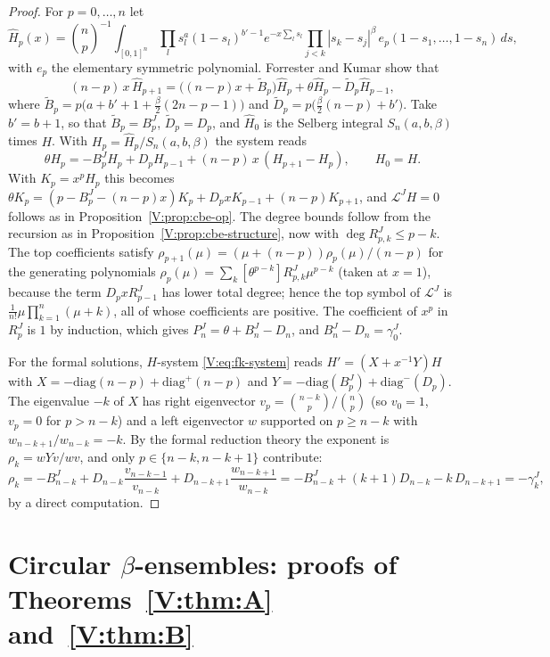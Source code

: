 \documentclass[11pt,a4paper]{article}
\theoremstyle{definition}
\theoremstyle{remark}
\numberwithin{equation}{section}
\begin{document}
\begin{proof}
For $p=0,\dots,n$ let
\[
\hat H_p(x)=\binom np^{-1}\int_{[0,1]^n}\prod_ls_l^{a}(1-s_l)^{b'-1}e^{-x\sum_ls_l}\prod_{j<k}|s_k-s_j|^\beta\,e_p(1-s_1,\dots,1-s_n)\,ds,
\]
with $e_p$ the elementary symmetric polynomial. Forrester and Kumar \cite[Cor.~2.5]{FK22} show that
\[
(n-p)\,x\,\hat H_{p+1}=\bigl((n-p)x+\tilde B_p\bigr)\hat H_p+\theta\hat H_p-\tilde D_p\hat H_{p-1},
\]
where $\tilde B_p=p\bigl(a+b'+1+\frac\beta2(2n-p-1)\bigr)$ and $\tilde D_p=p\bigl(\frac\beta2(n-p)+b'\bigr)$.
Take $b'=b+1$, so that $\tilde B_p=B^J_p$, $\tilde D_p=D_p$, and $\hat H_0$ is the Selberg integral $S_n(a,b,\beta)$ times $H$. With $H_p=\hat H_p/S_n(a,b,\beta)$ the system reads
\begin{equation}\label{V:eq:fk-system}
\theta H_p=-B^J_pH_p+D_pH_{p-1}+(n-p)\,x\,(H_{p+1}-H_p),\qquad H_0=H .
\end{equation}
With $K_p=x^pH_p$ this becomes $\theta K_p=(p-B^J_p-(n-p)x)K_p+D_pxK_{p-1}+(n-p)K_{p+1}$, and $\mathcal L^JH=0$ follows as in Proposition~\ref{V:prop:cbe-op}. The degree bounds follow from the recursion as in Proposition~\ref{V:prop:cbe-structure}, now with $\deg R^J_{p,k}\le p-k$. The top coefficients satisfy $\rho_{p+1}(\mu)=(\mu+(n-p))\rho_p(\mu)/(n-p)$ for the generating polynomials $\rho_p(\mu)=\sum_k[\theta^{p-k}]R^J_{p,k}\mu^{p-k}$ (taken at $x=1$), because the term $D_pxR^J_{p-1}$ has lower total degree; hence the top symbol of $\mathcal L^J$ is $\frac1{n!}\mu\prod_{k=1}^n(\mu+k)$, all of whose coefficients are positive. The coefficient of $x^{p}$ in $R^J_p$ is $1$ by induction, which gives $P^J_n=\theta+B^J_n-D_n$, and $B^J_n-D_n=\gamma^J_0$.

For the formal solutions, $H$-system \eqref{V:eq:fk-system} reads $H'=(X+x^{-1}Y)H$ with $X=-\mathrm{diag}(n-p)+\mathrm{diag}^+(n-p)$ and $Y=-\mathrm{diag}(B^J_p)+\mathrm{diag}^-(D_p)$. The eigenvalue $-k$ of $X$ has right eigenvector $v_p=\binom{n-k}p/\binom np$ (so $v_0=1$, $v_p=0$ for $p>n-k$) and a left eigenvector $w$ supported on $p\ge n-k$ with $w_{n-k+1}/w_{n-k}=-k$. By the formal reduction theory the exponent is $\rho_k=wYv/wv$, and only $p\in\{n-k,n-k+1\}$ contribute:
\[
\rho_k=-B^J_{n-k}+D_{n-k}\frac{v_{n-k-1}}{v_{n-k}}+D_{n-k+1}\frac{w_{n-k+1}}{w_{n-k}}=-B^J_{n-k}+(k+1)D_{n-k}-k\,D_{n-k+1}=-\gamma^J_k ,
\]
by a direct computation.
\end{proof}
\section{Circular \texorpdfstring{$\beta$}{beta}-ensembles: proofs of Theorems~\ref{V:thm:A} and~\ref{V:thm:B}}\label{V:sec:cbe}
\end{document}
